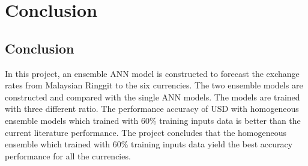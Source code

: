 \chapter{Conclusion}

\section{Conclusion}
In this project, an ensemble ANN model is constructed to forecast the exchange rates from Malaysian Ringgit to the six currencies. The two ensemble models are constructed and compared with the single ANN models. The models are trained with three different ratio.  The performance accuracy of USD with homogeneous ensemble models which trained with 60\% training inputs data is better than the current literature performance. The project concludes that the homogeneous ensemble which trained with 60\% training inputs data yield the best accuracy performance for all the currencies. 
